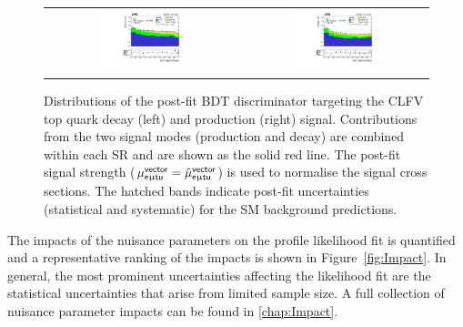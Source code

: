 \begin{figure}[tbh!]
 \begin{center}
 \begin{tabular}{cc}
  \includegraphics[width=0.48\textwidth]{figures/Part3/Results/BDT_TT_VecU}&
  \includegraphics[width=0.48\textwidth]{figures/Part3/Results/BDT_ST_VecU}\\
 \end{tabular}
 \caption{Distributions of the post-fit BDT discriminator targeting the CLFV top quark decay (left) and production (right) signal. Contributions from the two signal modes (production and decay) are combined within each SR and are shown as the solid red line. The post-fit signal strength ($\mu_{\textsf{e}\upmu\textsf{t{u}}}^{\textsf{vector}}=\hat{\mu}_{\textsf{e}\upmu\textsf{t{u}}}^{\textsf{vector}}$) is used to normalise the signal cross sections. The hatched bands indicate post-fit uncertainties (statistical and systematic) for the SM background predictions.}
 \label{fig:bdt_postfit_VecU}
 \end{center}
\end{figure} 

The impacts of the nuisance parameters on the profile likelihood fit is quantified and a representative ranking of the impacts is shown in Figure~\ref{fig:Impact}. In general, the most prominent uncertainties affecting the likelihood fit are the statistical uncertainties that arise from limited sample size. A full collection of nuisance parameter impacts can be found in \autoref{chap:Impact}.

